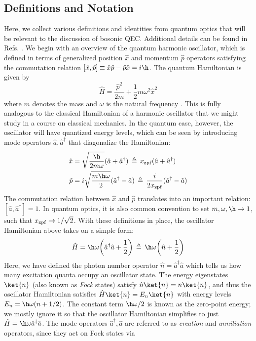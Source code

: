 \subsection{Definitions and Notation \label{sec:2_BosonicQEC_Definitions}}
Here, we collect various definitions and identities from quantum optics that will be relevant to the discussion of bosonic QEC. Additional details can be found in Refs. \cite{shankar1994principles, raimond2006exploring, grynberg2010introduction}. We begin with an overview of the quantum harmonic oscillator, which is defined in terms of generalized position $\hat{x}$ and momentum $\hat{p}$ operators satisfying the commutation relation $[\hat{x}, \hat{p}] \equiv \hat{x}\hat{p} - \hat{p}\hat{x} = i\h$. The quantum Hamiltonian is given by
\begin{equation}
    \hat{H} = \frac{\hat{p}^2}{2m} + \frac{1}{2}m\omega^2 \hat{x}^2
\end{equation}
where $m$ denotes the mass and $\omega$ is the natural frequency \cite{shankar1994principles}. This is fully analogous to the classical Hamiltonian of a harmonic oscillator that we might study in a course on classical mechanics. In the quantum case, however, the oscillator will have quantized energy levels, which can be seen by introducing mode operators $\hat{a}, \hat{a}^\dagger$ that diagonalize the Hamiltonian:
\begin{align}
\begin{split}
     \hat{x} &= \sqrt{\frac{\h}{2m\omega}}(\hat{a} + \hat{a}^\dagger) \,\triangleq\, x_{\rm zpf} (\hat{a} + \hat{a}^\dagger) \\
     \hat{p} &= i\sqrt{\frac{m\h\omega}{2}}(\hat{a}^\dagger - \hat{a}) \,\triangleq\, \frac{i}{2x_{\rm zpf}} (\hat{a}^\dagger - \hat{a})
\end{split}
\end{align}
The commutation relation between $\hat{x}$ and $\hat{p}$ translates into an important relation: $[\hat{a}, \hat{a}^\dagger] = 1$. In quantum optics, it is also common convention to set $m, \omega, \h \to 1$, such that $x_{\rm zpf} \to 1/\sqrt{2}$. With these definitions in place, the oscillator Hamiltonian above takes on a simple form:
\begin{equation}
    \hat{H} = \h\omega\bigg(\hat{a}^\dagger\hat{a} + \frac{1}{2}\bigg) \,\triangleq\, \h\omega\bigg(\hat{n} + \frac{1}{2}\bigg)
\end{equation}
Here, we have defined the photon number operator $\hat{n} = \hat{a}^\dagger\hat{a}$ which tells us how many excitation quanta occupy an oscillator state. The energy eigenstates $\ket{n}$ (also known as \textit{Fock} states) satisfy $\hat{n}\ket{n} = n\ket{n}$, and thus the oscillator Hamiltonian satisfies $\hat{H}\ket{n} = E_n\ket{n}$ with energy levels $E_n = \h\omega(n + 1/2)$. The constant term $\h\omega/2$ is known as the zero-point energy; we mostly ignore it so that the oscillator Hamiltonian simplifies to just $\hat{H} = \h\omega \hat{a}^\dagger\hat{a}$. The mode operators $\hat{a}^\dagger, \hat{a}$ are referred to as \textit{creation} and \textit{anniliation} operators, since they act on Fock states via
